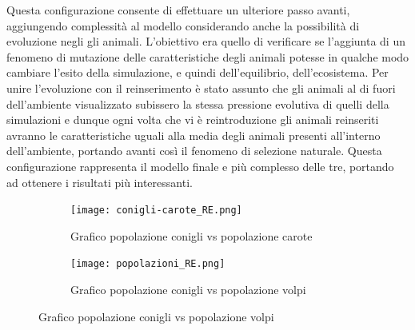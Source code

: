\documentclass[11pt]{article}
\begin{document}
Questa configurazione consente di effettuare un ulteriore passo avanti, aggiungendo complessità al modello considerando anche la possibilità di evoluzione negli gli animali. L'obiettivo era quello di verificare se l'aggiunta di un fenomeno di mutazione delle caratteristiche degli animali potesse in qualche modo cambiare l'esito della simulazione, e quindi dell'equilibrio, dell'ecosistema. Per unire l'evoluzione con il reinserimento è stato assunto che gli animali al di fuori dell'ambiente visualizzato subissero la stessa pressione evolutiva di quelli della simulazioni e dunque ogni volta che vi è reintroduzione gli animali reinseriti avranno le caratteristiche uguali alla media degli animali presenti all'interno dell'ambiente, portando avanti così il fenomeno di selezione naturale. Questa configurazione rappresenta il modello finale e più complesso delle tre, portando ad ottenere i risultati più interessanti.

\begin{figure}[h!]
	\hspace{-5mm}
	\begin{subfigure}{.5\textwidth}
    \centering
     \texttt{[image: conigli-carote\_RE.png]}
     \caption{Grafico popolazione conigli vs popolazione carote}
     \label{fig:conigliCaroteRE}
	\end{subfigure}
	\begin{subfigure}{.5\textwidth}
		\hspace{5mm}
		\centering
     \texttt{[image: popolazioni\_RE.png]}
     \caption{Grafico popolazione conigli vs popolazione volpi}
     \label{fig:conigliVolpiRE}
	\end{subfigure}
\end{figure}
\end{document}
